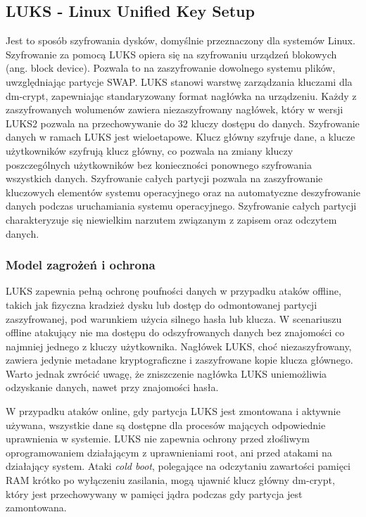 \documentclass[a4paper]{article}
\begin{document}
\subsection{LUKS - Linux Unified Key Setup}
Jest to sposób szyfrowania dysków, domyślnie przeznaczony dla systemów Linux. Szyfrowanie
za pomocą LUKS opiera się na szyfrowaniu urządzeń blokowych (ang. block device). Pozwala to
na zaszyfrowanie dowolnego systemu plików, uwzględniając partycje SWAP. LUKS stanowi warstwę
zarządzania kluczami dla dm-crypt, zapewniając standaryzowany format nagłówka na urządzeniu.
Każdy z zaszyfrowanych wolumenów zawiera niezaszyfrowany nagłówek, który w wersji LUKS2
pozwala na przechowywanie do 32 kluczy dostępu do danych. Szyfrowanie danych w ramach LUKS
jest wieloetapowe. Klucz główny szyfruje dane, a klucze użytkowników szyfrują klucz główny,
co pozwala na zmiany kluczy poszczególnych użytkowników bez konieczności ponownego szyfrowania
wszystkich danych. Szyfrowanie całych partycji pozwala na zaszyfrowanie kluczowych elementów
systemu operacyjnego oraz na automatyczne deszyfrowanie danych podczas uruchamiania systemu
operacyjnego. Szyfrowanie całych partycji charakteryzuje się niewielkim narzutem związanym
z zapisem oraz odczytem danych.

\subsubsection{Model zagrożeń i ochrona}
LUKS zapewnia pełną ochronę poufności danych w przypadku ataków offline, takich jak fizyczna
kradzież dysku lub dostęp do odmontowanej partycji zaszyfrowanej, pod warunkiem użycia silnego
hasła lub klucza. W scenariuszu offline atakujący nie ma dostępu do odszyfrowanych danych bez
znajomości co najmniej jednego z kluczy użytkownika. Nagłówek LUKS, choć niezaszyfrowany,
zawiera jedynie metadane kryptograficzne i zaszyfrowane kopie klucza głównego.
Warto jednak zwrócić uwagę, że zniszczenie nagłówka LUKS uniemożliwia odzyskanie danych,
nawet przy znajomości hasła.

W przypadku ataków online, gdy partycja LUKS jest zmontowana i aktywnie używana, wszystkie
dane są dostępne dla procesów mających odpowiednie uprawnienia w systemie. LUKS nie zapewnia
ochrony przed złośliwym oprogramowaniem działającym z uprawnieniami root, ani przed atakami
na działający system. Ataki \textit{cold boot}, polegające na odczytaniu zawartości pamięci
RAM krótko po wyłączeniu zasilania, mogą ujawnić klucz główny dm-crypt, który jest przechowywany
w pamięci jądra podczas gdy partycja jest zamontowana.
\end{document}
